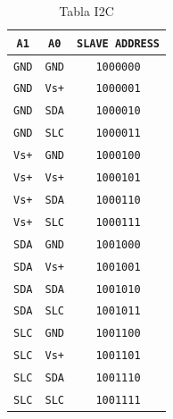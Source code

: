                     \begin{table}[H]
                        \centering
                        \begin{tabular}{|c|c|c|}
                        \hline
                            \texttt{A1} & \texttt{A0} & \texttt{SLAVE ADDRESS}\\
                        \hline
                             \texttt{GND} & \texttt{GND} & \texttt{1000000}\\
                        \hline
                            \texttt{GND} & \texttt{Vs+} & \texttt{1000001}\\
                        \hline
                            \texttt{GND} & \texttt{SDA} & \texttt{1000010}\\
                        \hline
                            \texttt{GND} & \texttt{SLC} & \texttt{1000011}\\
                        \hline
                            \texttt{Vs+} & \texttt{GND} & \texttt{1000100}\\
                        \hline
                            \texttt{Vs+} & \texttt{Vs+} & \texttt{1000101}\\
                        \hline
                            \texttt{Vs+} & \texttt{SDA} & \texttt{1000110}\\
                        \hline
                            \texttt{Vs+} & \texttt{SLC} & \texttt{1000111}\\
                        \hline
                            \texttt{SDA} & \texttt{GND} & \texttt{1001000}\\
                        \hline
                            \texttt{SDA} & \texttt{Vs+} & \texttt{1001001}\\
                        \hline
                            \texttt{SDA} & \texttt{SDA} & \texttt{1001010}\\
                        \hline
                            \texttt{SDA} & \texttt{SLC} & \texttt{1001011}\\
                        \hline
                            \texttt{SLC} & \texttt{GND} & \texttt{1001100}\\
                        \hline
                            \texttt{SLC} & \texttt{Vs+} & \texttt{1001101}\\
                        \hline
                            \texttt{SLC} & \texttt{SDA} & \texttt{1001110}\\
                        \hline
                            \texttt{SLC} & \texttt{SLC} & \texttt{1001111}\\
                        \hline
                        \end{tabular}
                        \caption{Tabla I2C}
                        \label{tab:s4}
                    \end{table}
